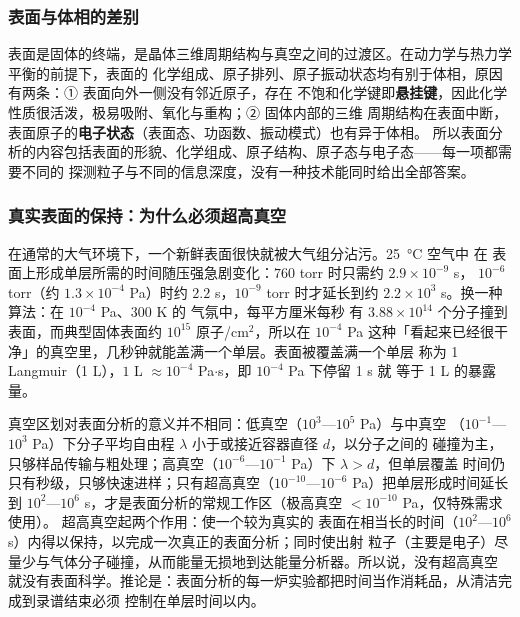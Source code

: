 \subsubsection{表面与体相的差别}

表面是固体的终端，是晶体三维周期结构与真空之间的过渡区。在动力学与热力学平衡的前提下，表面的
化学组成、原子排列、原子振动状态均有别于体相，原因有两条：① 表面向外一侧没有邻近原子，存在
不饱和化学键即\textbf{悬挂键}，因此化学性质很活泼，极易吸附、氧化与重构；② 固体内部的三维
周期结构在表面中断，表面原子的\textbf{电子状态}（表面态、功函数、振动模式）也有异于体相。
所以表面分析的内容包括表面的形貌、化学组成、原子结构、原子态与电子态——每一项都需要不同的
探测粒子与不同的信息深度，没有一种技术能同时给出全部答案。

\subsubsection{真实表面的保持：为什么必须超高真空}

在通常的大气环境下，一个新鲜表面很快就被大气组分沾污。\qty{25}{\celsius} 空气中  在
表面上形成单层所需的时间随压强急剧变化：$760$ torr 时只需约 $2.9\times10^{-9}$ s，
$10^{-6}$ torr（约 $1.3\times10^{-4}$ Pa）时约 $2.2$ s，$10^{-9}$ torr 时才延长到约
$2.2\times10^{3}$ s。换一种算法：在 $10^{-4}$ Pa、$300$ K 的  气氛中，每平方厘米每秒
有 $3.88\times10^{14}$ 个分子撞到表面，而典型固体表面约 $10^{15}$ 原子/cm$^{2}$，所以在
$10^{-4}$ Pa 这种「看起来已经很干净」的真空里，几秒钟就能盖满一个单层。表面被覆盖满一个单层
称为 1 Langmuir（1 L），$1$ L $\approx 10^{-4}$ Pa$\cdot$s，即 $10^{-4}$ Pa 下停留 1 s 就
等于 1 L 的暴露量。

真空区划对表面分析的意义并不相同：低真空（$10^{3}$—$10^{5}$ Pa）与中真空
（$10^{-1}$—$10^{3}$ Pa）下分子平均自由程 $\lambda$ 小于或接近容器直径 $d$，以分子之间的
碰撞为主，只够样品传输与粗处理；高真空（$10^{-6}$—$10^{-1}$ Pa）下 $\lambda>d$，但单层覆盖
时间仍只有秒级，只够快速进样；只有超高真空（$10^{-10}$—$10^{-6}$ Pa）把单层形成时间延长到
$10^{2}$—$10^{6}$ s，才是表面分析的常规工作区（极高真空 $<10^{-10}$ Pa，仅特殊需求使用）。
超高真空起两个作用：使一个较为真实的
表面在相当长的时间（$10^{2}$—$10^{6}$ s）内得以保持，以完成一次真正的表面分析；同时使出射
粒子（主要是电子）尽量少与气体分子碰撞，从而能量无损地到达能量分析器。所以说，没有超高真空
就没有表面科学。推论是：表面分析的每一炉实验都把时间当作消耗品，从清洁完成到录谱结束必须
控制在单层时间以内。

